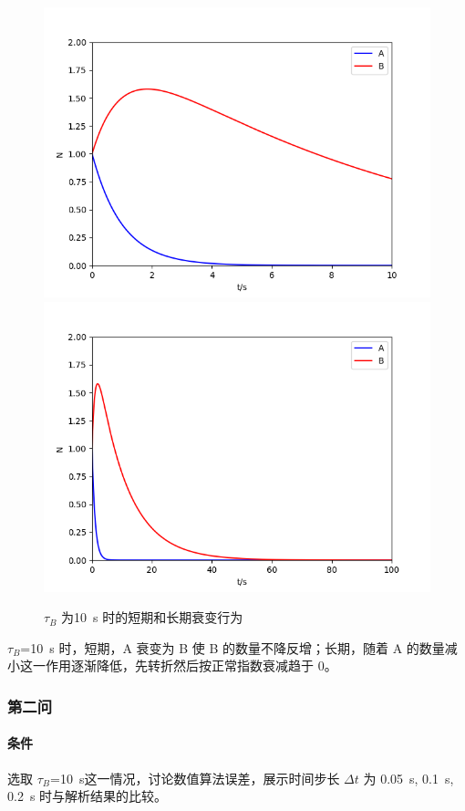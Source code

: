 \documentclass{ctexart}
\begin{document}
\begin{figure}[h]
\includegraphics[scale = 0.4]{b10_s.png}
\includegraphics[scale = 0.4]{b10_l.png}
\caption{$\tau_B$ 为10~s 时的短期和长期衰变行为}
\end{figure}

$\tau_B$=10~s 时，短期，A 衰变为 B 使 B 的数量不降反增；长期，随着 A 的数量减小这一作用逐渐降低，先转折然后按正常指数衰减趋于 0。

\subsubsection{第二问}
\paragraph{条件} 选取 $\tau_B$=10~s这一情况，讨论数值算法误差，展示时间步长 $\Delta t$ 为 0.05~s, 0.1~s, 0.2~s 时与解析结果的比较。
\end{document}
